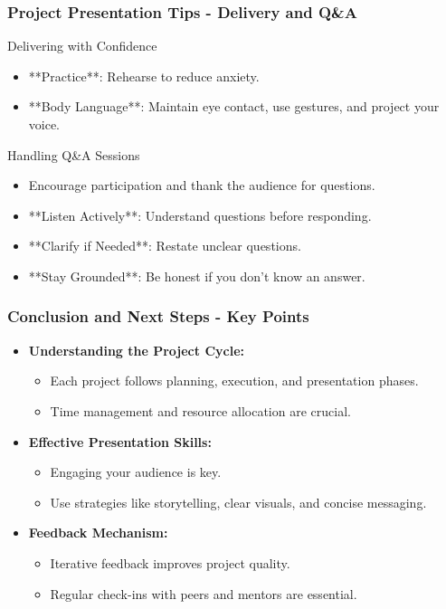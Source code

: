 \documentclass[aspectratio=169]{beamer}
\begin{document}
\begin{frame}[fragile]
    \frametitle{Project Presentation Tips - Delivery and Q\&A}
    \begin{block}{Delivering with Confidence}
        \begin{itemize}
            \item **Practice**: Rehearse to reduce anxiety.
            \item **Body Language**: Maintain eye contact, use gestures, and project your voice.
        \end{itemize}
    \end{block}

    \begin{block}{Handling Q\&A Sessions}
        \begin{itemize}
            \item Encourage participation and thank the audience for questions.
            \item **Listen Actively**: Understand questions before responding.
            \item **Clarify if Needed**: Restate unclear questions.
            \item **Stay Grounded**: Be honest if you don't know an answer.
        \end{itemize}
    \end{block}
\end{frame}

\begin{frame}[fragile]
    \frametitle{Conclusion and Next Steps - Key Points}
    \begin{itemize}
        \item \textbf{Understanding the Project Cycle:}
        \begin{itemize}
            \item Each project follows planning, execution, and presentation phases.
            \item Time management and resource allocation are crucial.
        \end{itemize}
        
        \item \textbf{Effective Presentation Skills:}
        \begin{itemize}
            \item Engaging your audience is key.
            \item Use strategies like storytelling, clear visuals, and concise messaging.
        \end{itemize}
        
        \item \textbf{Feedback Mechanism:}
        \begin{itemize}
            \item Iterative feedback improves project quality.
            \item Regular check-ins with peers and mentors are essential.
        \end{itemize}
    \end{itemize}
\end{frame}
\end{document}
